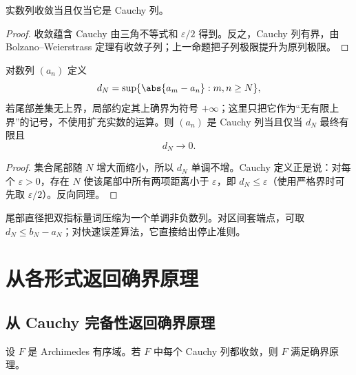 \begin{theorem}
实数列收敛当且仅当它是 Cauchy 列。
\end{theorem}

\begin{proof}
收敛蕴含 Cauchy 由三角不等式和 \(\varepsilon/2\) 得到。反之，Cauchy 列有界，由 Bolzano--Weierstrass 定理有收敛子列；上一命题把子列极限提升为原列极限。
\end{proof}

\begin{proposition}[尾部直径]
对数列 \((a_n)\) 定义
\[
 d_N=\sup\{\abs{a_m-a_n}:m,n\ge N\},
\]
若尾部差集无上界，局部约定其上确界为符号 \(+\infty\)；这里只把它作为“无有限上界”的记号，不使用扩充实数的运算。则 \((a_n)\) 是 Cauchy 列当且仅当 \(d_N\) 最终有限且
\[
 d_N\to0.
\]
\end{proposition}

\begin{proof}
集合尾部随 \(N\) 增大而缩小，所以 \(d_N\) 单调不增。Cauchy 定义正是说：对每个 \(\varepsilon>0\)，存在 \(N\) 使该尾部中所有两项距离小于 \(\varepsilon\)，即 \(d_N\le\varepsilon\)（使用严格界时可先取 \(\varepsilon/2\)）。反向同理。
\end{proof}

尾部直径把双指标量词压缩为一个单调非负数列。对区间套端点，可取 \(d_N\le b_N-a_N\)；对快速误差算法，它直接给出停止准则。

\section{从各形式返回确界原理}

\subsection{从 Cauchy 完备性返回确界原理}


\begin{theorem}
设 \(F\) 是 Archimedes 有序域。若 \(F\) 中每个 Cauchy 列都收敛，则 \(F\) 满足确界原理。
\end{theorem}

